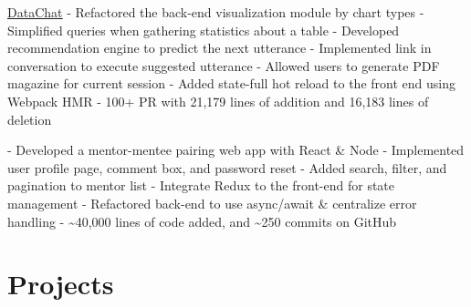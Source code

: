 \documentclass[letterpaper]{twentysecondcv} %
\begin{document}
\begin{twenty} %
    {\href{https://datachat.ai/}{\underline{{DataChat}}}}
    {
    - Refactored the back-end visualization module by chart types \newline
    - Simplified queries when gathering statistics about a table\newline
    - Developed recommendation engine to predict the next utterance\newline
    - Implemented link in conversation to execute suggested utterance \newline
    - Allowed users to generate PDF magazine for current session\newline
    - Added state-full hot reload to the front end using Webpack HMR \newline
    - 100+ PR with 21,179 lines of addition and 16,183 lines of deletion \newline
    }
	
	{
	- Developed a mentor-mentee pairing web app with React \& Node\newline
	- Implemented user profile page, comment box, and password reset \newline
	- Added search, filter, and pagination to mentor list \newline
	- Integrate Redux to the front-end for state management \newline
	- Refactored  back-end to use async/await \& centralize error handling \newline
	- \textasciitilde{}40,000 lines of code added, and \textasciitilde{}250 commits on GitHub
	}
\end{twenty}


\section{Projects}
\end{document}
